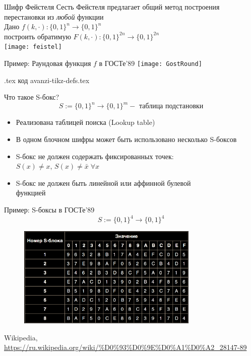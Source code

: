 \documentclass[usenames,dvipsnames,8pt,aspectratio=169]{beamer}
\begin{document}
\begin{frame}{Шифр Фейстеля}
\Large
	Сесть Фейстеля предлагает общий метод построения перестановки из \emph{любой} функции\\[10pt]
	Дано \hspace{40pt} $f(k, \cdot): \{0,1\}^n \rightarrow \{0,1\}^n$ \\[7pt]
	построить обратимую $F(k, \cdot):\{0,1\}^{2n} \rightarrow \{0,1\}^{2n}$ \\
	\centering
	\texttt{[image: feistel]}
\end{frame}


\begin{frame}{Пример: Раундовая функция $f$ в ГОСТе'89}
\centering
{}
\texttt{[image: GostRound]}

\vfill
\small
{\color{gray} {.tex код avanzi-tikz-defs.tex }} 
\end{frame}

\begin{frame}{Что такое S-бокс?}
	\LARGE
	\[
		S:= \{0,1\}^n \rightarrow \{0,1\}^m - \text{ таблица подстановки}
	\]

	\begin{itemize}
		\itemsep 7pt
		\item Реализована таблицей поиска (Lookup table)
		\item В одном блочном шифры может быть использовано несколько S-боксов
		\item S-бокс не должен содержать фиксированных точек: \\ $S(x) \neq x $, $S(x) \neq  \bar{x} \; \forall x$
		\item S-бокс не должен быть линейной или аффинной булевой \\ функцией
	\end{itemize}
\end{frame}

\begin{frame}{Пример: S-боксы в ГОСТе'89}
	\Large
	\[
	S:= \{0,1\}^4 \rightarrow \{0,1\}^4
	\]
	
	\begin{figure}
		\includegraphics[width=0.77\textwidth]{Sbox_GOST}
			\hspace{5em}
	\end{figure}
\vfill
\small
{\color{gray} {Wikipedia, \url{https://ru.wikipedia.org/wiki/\%D0\%93\%D0\%9E\%D0\%A1\%D0\%A2_28147-89}}} 
\end{frame}
\end{document}
